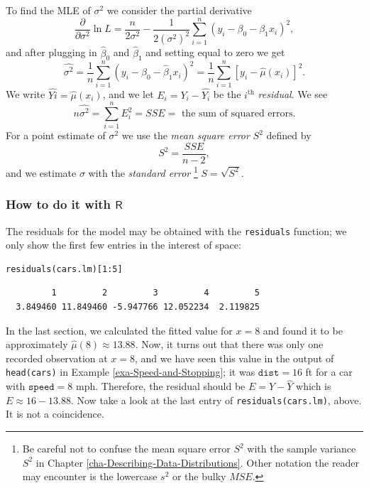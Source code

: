 \documentclass[captions=tableheading]{scrbook}
\begin{document}
To find the MLE of \(\sigma^{2}\) we consider the partial derivative
\begin{equation}
\frac{\partial}{\partial\sigma^{2}}\ln L=\frac{n}{2\sigma^{2}}-\frac{1}{2(\sigma^{2})^{2}}\sum_{i=1}^{n}(y_{i}-\beta_{0}-\beta_{1}x_{i})^{2},
\end{equation}
and after plugging in \(\hat{\beta}_{0}\) and \(\hat{\beta}_{1}\) and setting equal to zero we get
\begin{equation}
\hat{\sigma^{2}}=\frac{1}{n}\sum_{i=1}^{n}(y_{i}-\hat{\beta}_{0}-\hat{\beta}_{1}x_{i})^{2}=\frac{1}{n}\sum_{i=1}^{n}[y_{i}-\hat{\mu}(x_{i})]^{2}.
\end{equation}
We write \(\hat{Yi}=\hat{\mu}(x_{i})\), and we let \(E_{i}=Y_{i}-\hat{Y_{i}}\) be the \(i^{\mathrm{th}}\) \emph{residual}. We see 
\begin{equation}
n\hat{\sigma^{2}}=\sum_{i=1}^{n}E_{i}^{2}=SSE=\mbox{ the sum of squared errors.}
\end{equation}
For a point estimate of \(\sigma^{2}\) we use the \emph{mean square error} \(S^{2}\) defined by 
\begin{equation}
S^{2}=\frac{SSE}{n-2},
\end{equation}
and we estimate \(\sigma\) with the \emph{standard error}
\footnote{Be careful not to confuse the mean square error \(S^{2}\) with the sample variance \(S^{2}\) in Chapter \ref{cha-Describing-Data-Distributions}. Other notation the reader may encounter is the lowercase \(s^{2}\) or the bulky \(MSE\).}
\(S=\sqrt{S^{2}}\).
\subsubsection{How to do it with \(\mathsf{R}\)}
\label{sec-11-2-3-1}


The residuals for the model may be obtained with the \texttt{residuals} function; we only show the first few entries in the interest of space:


\lstset{language=R}
\begin{lstlisting}
residuals(cars.lm)[1:5]
\end{lstlisting}

\begin{verbatim}
         1         2         3         4         5 
  3.849460 11.849460 -5.947766 12.052234  2.119825
\end{verbatim}



In the last section, we calculated the fitted value for \(x=8\) and found it to be approximately \( \hat{\mu}(8)\approx  13.88 \). Now, it turns out that there was only one recorded observation at \(x = 8\), and we have seen this value in the output of \texttt{head(cars)} in Example \ref{exa-Speed-and-Stopping}; it was \(\mathtt{dist} = 16\) ft for a car with \( \mathtt{speed} = 8 \) mph. Therefore, the residual should be \(E = Y - \hat{Y}\) which is \(E \approx 16 -  13.88 \). Now take a look at the last entry of \texttt{residuals(cars.lm)}, above. It is not a coincidence.
\end{document}
